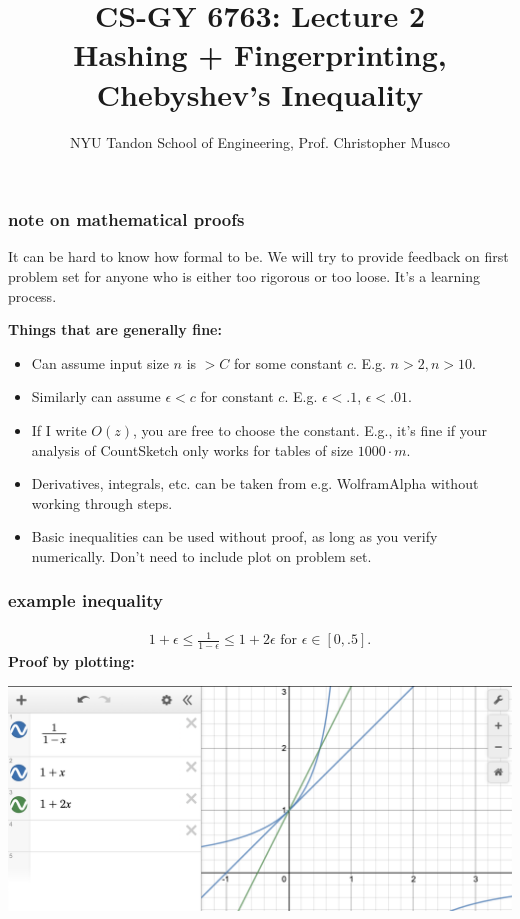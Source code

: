 \documentclass[handout,compress]{beamer}
\title{CS-GY 6763: Lecture 2 \\ Hashing + Fingerprinting, Chebyshev's Inequality}
\author{NYU Tandon School of Engineering, Prof. Christopher Musco}
\date{}
\begin{document}
\begin{frame}
	\titlepage 
\end{frame}

\begin{frame}
	\frametitle{note on mathematical proofs}
	\small
	It can be hard to know how formal to be. We will try to provide feedback on first problem set for anyone who is either too rigorous or too loose. It's a learning process.
	
	\textbf{Things that are generally fine:}
	\begin{itemize}
		\item Can assume input size $n$ is $> C$ for some constant $c$. E.g. $n > 2, n> 10$.
		\item Similarly can assume $\epsilon < c$ for constant $c$. E.g. $\epsilon < .1$, $\epsilon < .01$.
		\item If I write $O(z)$, you are free to choose the constant. E.g., it's fine if your analysis of CountSketch only works for tables of size $1000\cdot m$. 
		\item Derivatives, integrals, etc. can be taken from e.g. WolframAlpha without working through steps.
		\item Basic inequalities can be used {without proof}, as long as you verify numerically. Don't need to include plot on problem set.
	\end{itemize}
\end{frame}

\begin{frame}
	\frametitle{example inequality}
	\begin{align*}
		1+\epsilon \leq \frac{1}{1-\epsilon} \leq 1+ 2\epsilon \text{ for } \epsilon \in [0,.5].
	\end{align*}
\textbf{Proof by plotting:}
\begin{center}
	\includegraphics[width=\textwidth]{proof1.png}
\end{center}
\end{frame}
\end{document}
